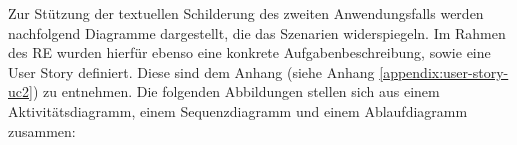     \linebreak
    Zur Stützung der textuellen Schilderung des zweiten Anwendungsfalls werden nachfolgend Diagramme dargestellt, die das Szenarien 
    widerspiegeln. Im Rahmen des \acs{RE} wurden hierfür ebenso eine konkrete Aufgabenbeschreibung, sowie eine User Story definiert. Diese sind dem 
    Anhang (siehe Anhang \ref{appendix:user-story-uc2}) zu entnehmen. Die folgenden Abbildungen stellen sich aus einem 
    Aktivitätsdiagramm, einem Sequenzdiagramm und einem Ablaufdiagramm zusammen: 
    